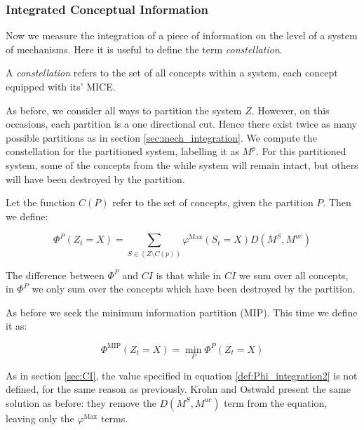 \subsubsection{Integrated Conceptual Information}
Now we measure the integration of a piece of information on the level of a system of mechanisms. Here it is useful to define the term \textit{constellation}.

\begin{definition}
	{A \textit{constellation} refers to the set of all concepts within a system, each concept equipped with its' MICE.}
\end{definition}

As before, we consider all ways to partition the system $Z$. However, on this occasions, each partition is a one directional cut. Hence there exist twice as many possible partitions as in section \ref{sec:mech_integration}. We compute the constellation for the partitioned system, labelling it as $M^p$. For this partitioned system, some of the concepts from the while system will remain intact, but others will have been destroyed by the partition.

Let the function $C(P)$ refer to the set of concepts, given the partition $P$. Then we define:

\begin{equation}
\label{def:Phi_integration1}
\Phi^P(Z_t = X) = \sum \limits_{S \in (Z \setminus C(p))} \varphi^{\text{Max}}(S_t = X)D(M^S, M^{uc})
\end{equation}

The difference between $\Phi^P$ and $CI$ is that while in $CI$ we sum over all concepts, in $\Phi^P$ we only sum over the concepts which have been destroyed by the partition.

As before we seek the minimum information partition (MIP). This time we define it as:

\begin{equation}
\label{def:Phi_integration2}
\Phi^{\text{MIP}} (Z_t = X) = \min \limits_{P} \Phi^P(Z_t = X)
\end{equation}

\begin{remark}
	As in section \ref{sec:CI}, the value specified in equation \ref{def:Phi_integration2} is not defined, for the same reason as previously. Krohn and Ostwald present the same solution as before: they remove the $D(M^S, M^{uc})$ term from the equation, leaving only the $\varphi^{\text{Max}}$ terms.
\end{remark}

